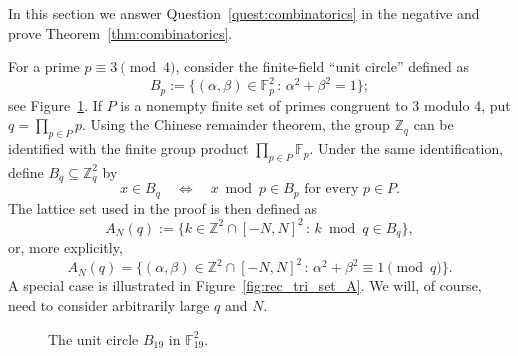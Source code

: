 \documentclass[10pt,a4paper]{amsart}
\numberwithin{equation}{section}
\begin{document}
In this section we answer Question~\ref{quest:combinatorics} in the negative and prove Theorem~\ref{thm:combinatorics}.

For a prime $p\equiv3\pmod4$, consider the finite-field ``unit circle'' defined as
\begin{equation*}%
B_p:=\{(\alpha,\beta)\in\mathbb{F}_p^2 \,:\, \alpha^2+\beta^2=1\};
\end{equation*}
see Figure~\ref{fig:unit_circle}.
If $P$ is a nonempty finite set of primes congruent to $3$ modulo $4$, put $q=\prod_{p\in P}p$.
Using the Chinese remainder theorem, the group $\mathbb{Z}_q$ can be identified with the finite group product $\prod_{p\in P}\mathbb{F}_p$. Under the same identification, define $B_q\subseteq\mathbb{Z}_q^2$ by
\[ x\in B_q \quad\Longleftrightarrow\quad
x\bmod p\in B_p\text{ for every }p\in P. \]
The lattice set used in the proof is then defined as
\[ A_N(q) := \{k\in\mathbb{Z}^2\cap[-N,N]^2 \,:\, k\bmod q\in B_q\}, \]
or, more explicitly,
\[ A_N(q) = \{ (\alpha,\beta)\in\mathbb{Z}^2\cap[-N,N]^2 \,:\, \alpha^2+\beta^2 \equiv 1 \!\!\!\pmod q \}. \]
A special case is illustrated in Figure~\ref{fig:rec_tri_set_A}. We will, of course, need to consider arbitrarily large $q$ and $N$.

\begin{figure}
\begin{center}
\end{center}
\caption{The unit circle $B_{19}$ in $\mathbb{F}_{19}^2$.}
\label{fig:unit_circle}
\end{figure}
\end{document}
